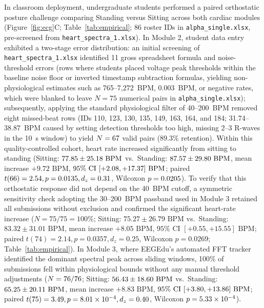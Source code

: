 \documentclass[11pt,letterpaper]{article}
\providecommand{\NRoster}{86}
\providecommand{\ModTwoSubmitted}{75}
\providecommand{\ModTwoPctValid}{89.3}
\providecommand{\ModTwoDiffMean}{+9.72}
\providecommand{\ModThreeSubmitted}{76}
\providecommand{\ModThreeDiffMean}{+8.83}
\providecommand{\ModTwoSymN}{75}
\providecommand{\ModTwoSymDF}{74}
\providecommand{\ModTwoSymStandMean}{83.32}
\providecommand{\ModTwoSymStandSD}{31.01}
\providecommand{\ModTwoSymSitMean}{75.27}
\providecommand{\ModTwoSymSitSD}{26.79}
\providecommand{\ModTwoSymDiffMean}{+8.05}
\providecommand{\ModTwoSymT}{2.14}
\providecommand{\ModTwoSymP}{0.0357}
\providecommand{\ModTwoSymWilcoxP}{0.0269}
\providecommand{\ModTwoSymDz}{0.25}
\providecommand{\ModTwoSymCILow}{+0.55}
\providecommand{\ModTwoSymCIHigh}{+15.55}
\begin{document}
In classroom deployment, undergraduate students performed a paired orthostatic posture challenge comparing Standing versus Sitting across both cardiac modules (Figure~\ref{fig:ecg}C; Table~\ref{tab:empirical}; $\NRoster$ roster IDs in \texttt{alpha\_single.xlsx}, pre-screened from \texttt{heart\_spectra\_1.xlsx}). In Module 2, student data entry exhibited a two-stage error distribution: an initial screening of \texttt{heart\_spectra\_1.xlsx} identified 11 gross spreadsheet formula and noise-threshold errors (rows where students placed voltage peak thresholds within the baseline noise floor or inverted timestamp subtraction formulas, yielding non-physiological estimates such as 765--7,272~BPM, 0.003~BPM, or negative rates, which were blanked to leave $N = \ModTwoSubmitted$ numerical pairs in \texttt{alpha\_single.xlsx}); subsequently, applying the standard physiological filter of 40--200~BPM removed eight missed-beat rows (IDs 110, 123, 130, 135, 149, 163, 164, and 184; 31.74--38.87~BPM caused by setting detection thresholds too high, missing 2--3 R-waves in the 10~s window) to yield $N = 67$ valid pairs ($\ModTwoPctValid\%$ retention). Within this quality-controlled cohort, heart rate increased significantly from sitting to standing (Sitting: $77.85 \pm 25.18\text{ BPM}$ vs.\ Standing: $87.57 \pm 29.80\text{ BPM}$, mean increase $\ModTwoDiffMean\text{ BPM}$, $95\%\text{ CI } [+2.08, +17.37]\text{ BPM}$; paired $t(66) = 2.54, p = 0.0135, d_z = 0.31$, Wilcoxon $p = 0.0205$). To verify that this orthostatic response did not depend on the 40~BPM cutoff, a symmetric sensitivity check adopting the 30--200~BPM passband used in Module 3 retained all submissions without exclusion and confirmed the significant heart-rate increase ($N = \ModTwoSymN/\ModTwoSubmitted = 100\%$; Sitting: $\ModTwoSymSitMean \pm \ModTwoSymSitSD\text{ BPM}$ vs.\ Standing: $\ModTwoSymStandMean \pm \ModTwoSymStandSD\text{ BPM}$, mean increase $\ModTwoSymDiffMean\text{ BPM}$, $95\%\text{ CI } [\ModTwoSymCILow, \ModTwoSymCIHigh]\text{ BPM}$; paired $t(\ModTwoSymDF) = \ModTwoSymT, p = \ModTwoSymP, d_z = \ModTwoSymDz$, Wilcoxon $p = \ModTwoSymWilcoxP$; Table~\ref{tab:empirical}). In Module 3, where EEGEdu's automated FFT tracker identified the dominant spectral peak across sliding windows, 100\% of submissions fell within physiological bounds without any manual threshold adjustments ($N = \ModThreeN/\ModThreeSubmitted$; Sitting: $56.43 \pm 18.60\text{ BPM}$ vs.\ Standing: $65.25 \pm 20.11\text{ BPM}$, mean increase $\ModThreeDiffMean\text{ BPM}$, $95\%\text{ CI } [+3.80, +13.86]\text{ BPM}$; paired $t(75) = 3.49, p = 8.01\times 10^{-4}, d_z = 0.40$, Wilcoxon $p = 5.33\times 10^{-4}$).
\end{document}
